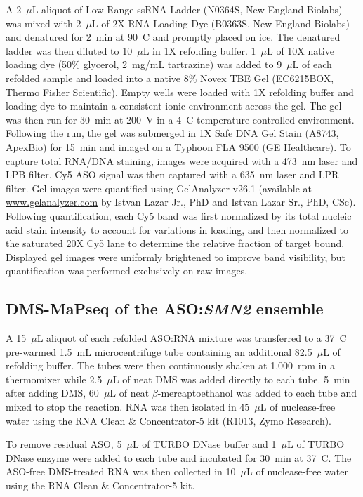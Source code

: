 \documentclass[unnumsec,webpdf,contemporary,large]{oup-authoring-template}%
\theoremstyle{thmstyleone}%
\theoremstyle{thmstyletwo}%
\theoremstyle{thmstylethree}%
\begin{document}
A 2~$\mu$L aliquot of Low Range ssRNA Ladder (N0364S, New England Biolabs) was mixed with 2~$\mu$L of 2X RNA Loading Dye (B0363S, New England Biolabs) and denatured for 2~min at 90~\textdegree C and promptly placed on ice. The denatured ladder was then diluted to 10~$\mu$L in 1X refolding buffer. 1~$\mu$L of 10X native loading dye (50\% glycerol, 2~mg/mL tartrazine) was added to 9~$\mu$L of each refolded sample and loaded into a native 8\% Novex\texttrademark{} TBE Gel (EC6215BOX, Thermo Fisher Scientific). Empty wells were loaded with 1X refolding buffer and loading dye to maintain a consistent ionic environment across the gel. The gel was then run for 30~min at 200~V in a 4~\textdegree C temperature-controlled environment.
Following the run, the gel was submerged in 1X Safe DNA Gel Stain (A8743, ApexBio) for 15~min and imaged on a Typhoon FLA 9500 (GE Healthcare). To capture total RNA/DNA staining, images were acquired with a 473~nm laser and LPB filter. Cy5 ASO signal was then captured with a 635~nm laser and LPR filter.
Gel images were quantified using GelAnalyzer v26.1 (available at \url{www.gelanalyzer.com} by Istvan Lazar Jr., PhD and Istvan Lazar Sr., PhD, CSc). Following quantification, each Cy5 band was first normalized by its total nucleic acid stain intensity to account for variations in loading, and then normalized to the saturated 20X Cy5 lane to determine the relative fraction of target bound. Displayed gel images were uniformly brightened to improve band visibility, but quantification was performed exclusively on raw images.

\subsection{DMS-MaPseq of the ASO:\textmd{\textit{SMN2}} ensemble}

A 15~$\mu$L aliquot of each refolded ASO:RNA mixture was transferred to a 37~\textdegree C pre-warmed 1.5~mL microcentrifuge tube containing an additional 82.5~$\mu$L of refolding buffer. The tubes were then continuously shaken at 1,000~rpm in a thermomixer while 2.5~$\mu$L of neat DMS was added directly to each tube. 5~min after adding DMS, 60~$\mu$L of neat $\beta$-mercaptoethanol was added to each tube and mixed to stop the reaction. RNA was then isolated in 45~$\mu$L of nuclease-free water using the RNA Clean \& Concentrator-5 kit (R1013, Zymo Research).

To remove residual ASO, 5~$\mu$L of TURBO DNase\texttrademark{} buffer and 1~$\mu$L of TURBO DNase\texttrademark{} enzyme were added to each tube and incubated for 30~min at 37~\textdegree C. The ASO-free DMS-treated RNA was then collected in 10~$\mu$L of nuclease-free water using the RNA Clean \& Concentrator-5 kit.
\end{document}
